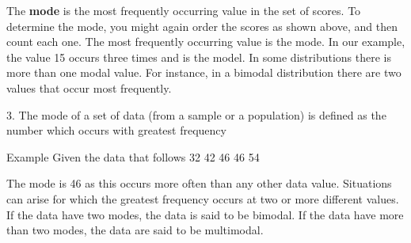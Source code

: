The \textbf{mode} is the most frequently occurring value in the set of scores. 
To determine the mode, you might again order the scores as shown above, and then count each one. 
The most frequently occurring value is the mode. In our example, the value 15 occurs three times 
and is the model. In some distributions there is more than one modal value. For instance, in a 
bimodal distribution there are two values that occur most frequently.


3.  The mode of a set of data (from a sample or a population) is defined as the number which occurs  with greatest frequency

Example  
Given the data that follows
32  42  46 46  54

The mode is 46 as this occurs more often than any other data value.
Situations can arise for which the greatest frequency occurs at two or more different values.
If the data have two modes, the data is said to be bimodal.  If the data have more than two modes, the data are said to be multimodal.
